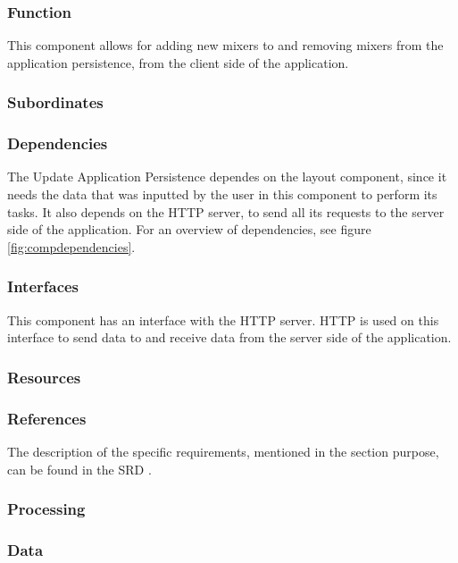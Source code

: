 \subsubsection*{Function}
This component allows for adding new mixers to and removing mixers from the application persistence, from the client side of the application.

\subsubsection*{Subordinates}

\subsubsection*{Dependencies}
The Update Application Persistence dependes on the layout component, since it needs the data that was inputted by the user in this component to perform its tasks. It also depends on the HTTP server, to send all its requests to the server side of the application. For an overview of dependencies, see figure \ref{fig:compdependencies}.

\subsubsection*{Interfaces}
This component has an interface with the HTTP server. HTTP is used on this interface to send data to and receive data from the server side of the application. 

\subsubsection*{Resources}

\subsubsection*{References}
The description of the specific requirements, mentioned in the section purpose, can be found in the SRD \cite{srd}.

\subsubsection*{Processing}

\subsubsection*{Data}
